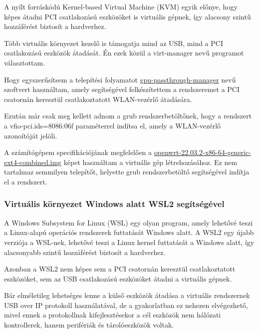 \documentclass[12pt]{article}
\begin{document}
A nyílt forráskódú Kernel-based Virtual Machine (KVM) egyik előnye, hogy képes
átadni PCI csatlakozású eszközöket is virtuális gépnek, így alacsony szintű hozzáférést biztosít a hardverhez. \cite{kvm} \cite{pci_passthrough}

Több virtuális környezet kezelő is támogatja mind az USB, mind a PCI csatlakozású eszközök átadását. Én ezek közül a virt-manager nevű programot választottam.


Hogy egyszerűsítsem a telepítési folyamatot \href{https://github.com/uwzis/gpu-passthrough-manager}{gpu-passthrough-manager} nevű szoftvert használtam, amely segítségével felkészítettem a rendszeremet a PCI csatornán keresztül csatlakoztatott WLAN-vezérlő átadására.

Ezután már csak meg kellett adnom a grub rendszerbetöltőnek, hogy a rendszert a vfio-pci.ids=8086:06f paraméterrel indítsa el, amely a WLAN-vezérlő azonoítóját jelöli.


A számítógépem specifikációjának megfelelően a \href{https://downloads.openwrt.org/releases/22.03.2/targets/x86/64/openwrt-22.03.2-x86-64-generic-ext4-combined.img.gz}{openwrt-22.03.2-x86-64-generic-ext4-combined.img} képet használtam a virtuális gép létrehozásához. Ez nem tartalmaz semmilyen telepítőt, helyette grub rendszerbetöltő segítségével indítja el a rendszert.

\subsubsection{Virtuális környezet Windows alatt WSL2 segítségével}

A Windows Subsystem for Linux (WSL) egy olyan program, amely lehetővé teszi a Linux-alapú operációs rendszerek futtatását Windows alatt. A WSL2 egy újabb verziója a WSL-nek, lehetővé teszi a Linux kernel futtatását a Windows alatt, így alacsonyabb szintű hozzáférést biztosít a hardverhez. \cite{wsl2}

Azonban a WSL2 nem képes sem a PCI csatornán keresztül csatlakoztatott eszközöket, sem az USB csatlakozású eszközöket átadni a virtuális gépnek.

Bár elméletileg lehetséges lenne a külső eszközök átadása a virtuális rendszernek USB over IP protokoll használatával, de a gyakorlatban ez nehezen elvégezhető, mivel ennek a protokollnak kifejlesztésekor a cél eszközök nem hálózati kontrollerek, hanem perifériák és tárolóeszközök voltak. \cite{wsl2_usbip}
\end{document}
